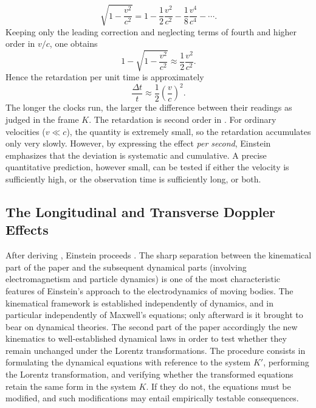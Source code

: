 \documentclass[pdflatex]{sn-jnl}
\begin{document}
\begin{equation*}
\sqrt{1-\frac{v^{2}}{c^{2}}}
=
1-\frac{1}{2}\frac{v^{2}}{c^{2}}
-\frac{1}{8}\frac{v^{4}}{c^{4}}
-\cdots .
\end{equation*}
%
Keeping only the leading correction and neglecting terms of fourth and higher order in $v/c$, one obtains
\begin{equation*}
1-\sqrt{1-\frac{v^{2}}{c^{2}}}
\approx
\frac{1}{2}\frac{v^{2}}{c^{2}} .
\end{equation*}
%
Hence the retardation per unit time is approximately
%
\begin{equation*}
\frac{\Delta t}{t}
\approx
\frac{1}{2}\left(\frac{v}{c}\right)^{2}.
\end{equation*}
%
The longer the clocks run, the larger the difference between their readings as judged in the frame $K$. The retardation is second order in \betafactorh. For ordinary velocities ($v\ll c$), the quantity \betafactorsquaredh is extremely small, so the retardation accumulates only very slowly. However, by expressing the effect \emph{per second}, Einstein emphasizes that the deviation is systematic and cumulative. A precise quantitative prediction, however small, can be tested if either the velocity is sufficiently high, or the observation time is sufficiently long, or both.

\subsection{The Longitudinal and Transverse Doppler Effects}
%
After deriving , Einstein proceeds  \citep[907]{Einstein1905}. The sharp separation between the kinematical part of the paper and the subsequent dynamical parts (involving electromagnetism and particle dynamics) is one of the most characteristic features of Einstein’s approach to the electrodynamics of moving bodies. The kinematical framework is established independently of dynamics, and in particular independently of Maxwell’s equations; only afterward is it brought to bear on dynamical theories. The second part of the paper accordingly  the new kinematics to well-established dynamical laws in order to test whether they remain unchanged under the Lorentz transformations. The procedure consists in formulating the dynamical equations with reference to the  system $K'$, performing the Lorentz transformation, and verifying whether the transformed equations retain the same form in the  system $K$. If they do not, the equations must be modified, and such modifications may entail empirically testable consequences.
\end{document}
